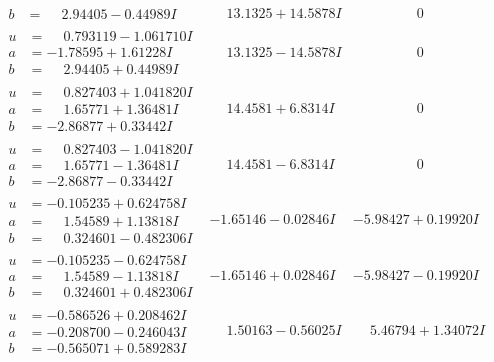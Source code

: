 \documentclass[1p]{elsarticle_modified}
\theoremstyle{definition}
\begin{document}
$$\begin{array}{c|c|c}
\begin{aligned}
b &= \phantom{-}2.94405 - 0.44989 I\end{aligned}
 & \phantom{-}13.1325 + 14.5878 I & \phantom{-0.000000 } 0 \\ \hline\begin{aligned}
u &= \phantom{-}0.793119 - 1.061710 I \\
a &= -1.78595 + 1.61228 I \\
b &= \phantom{-}2.94405 + 0.44989 I\end{aligned}
 & \phantom{-}13.1325 - 14.5878 I & \phantom{-0.000000 } 0 \\ \hline\begin{aligned}
u &= \phantom{-}0.827403 + 1.041820 I \\
a &= \phantom{-}1.65771 + 1.36481 I \\
b &= -2.86877 + 0.33442 I\end{aligned}
 & \phantom{-}14.4581 + 6.8314 I & \phantom{-0.000000 } 0 \\ \hline\begin{aligned}
u &= \phantom{-}0.827403 - 1.041820 I \\
a &= \phantom{-}1.65771 - 1.36481 I \\
b &= -2.86877 - 0.33442 I\end{aligned}
 & \phantom{-}14.4581 - 6.8314 I & \phantom{-0.000000 } 0 \\ \hline\begin{aligned}
u &= -0.105235 + 0.624758 I \\
a &= \phantom{-}1.54589 + 1.13818 I \\
b &= \phantom{-}0.324601 - 0.482306 I\end{aligned}
 & -1.65146 - 0.02846 I & -5.98427 + 0.19920 I \\ \hline\begin{aligned}
u &= -0.105235 - 0.624758 I \\
a &= \phantom{-}1.54589 - 1.13818 I \\
b &= \phantom{-}0.324601 + 0.482306 I\end{aligned}
 & -1.65146 + 0.02846 I & -5.98427 - 0.19920 I \\ \hline\begin{aligned}
u &= -0.586526 + 0.208462 I \\
a &= -0.208700 - 0.246043 I \\
b &= -0.565071 + 0.589283 I\end{aligned}
 & \phantom{-}1.50163 - 0.56025 I & \phantom{-}5.46794 + 1.34072 I \\ \hline\begin{aligned}

\end{aligned}
\end{array}$$
\end{document}
